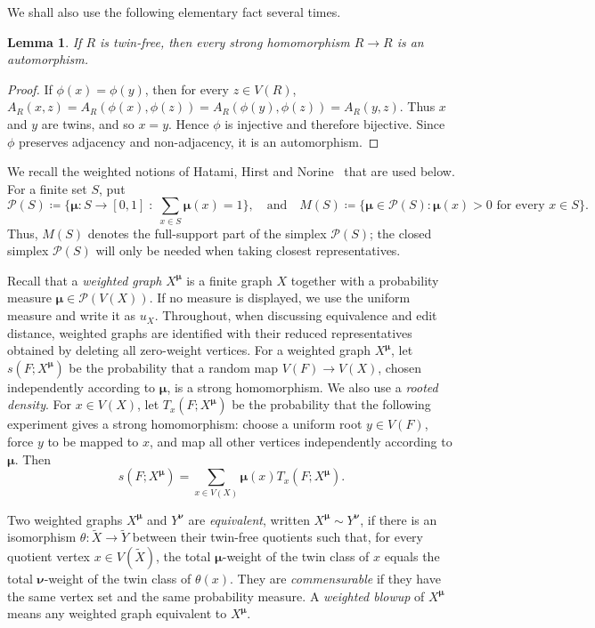 \documentclass[10pt]{article}
\theoremstyle{plain}
\newtheorem{lemma}[lemma]{Lemma}
\theoremstyle{remark}
\newcommand{\bmu}{{\boldsymbol{\mu}}}
\newcommand{\bnu}{{\boldsymbol{\nu}}}
\begin{document}
We shall also use the following elementary fact several times.

\begin{lemma}
\label{lem:twin-free-auto}
If $R$ is twin-free, then every strong homomorphism $R\to R$ is an automorphism.
\end{lemma}
\begin{proof}
If $\phi(x)=\phi(y)$, then for every $z\in V(R)$, $A_R(x,z)=A_R(\phi(x),\phi(z))=A_R(\phi(y),\phi(z))=A_R(y,z)$. Thus $x$ and $y$ are twins, and so $x=y$. Hence $\phi$ is injective and therefore bijective. Since $\phi$ preserves adjacency and non-adjacency, it is an automorphism.
\end{proof}


We recall the weighted notions of Hatami, Hirst and Norine~\cite[Section~2.1]{HatamiHirstNorine} that are used below.
For a finite set $S$, put
\[
        \mathcal P(S)\coloneqq
        \Big\{ \bmu:S\to[0,1]\;:\;\sum_{x\in S}\bmu(x)=1 \Big\},
        \quad\text{and}\quad
        M(S)\coloneqq\{\bmu\in\mathcal P(S):\bmu(x)>0\text{ for every }x\in S\}.
\]
Thus, $M(S)$ denotes the full-support part of the simplex $\mathcal P(S)$; the closed simplex $\mathcal P(S)$ will only be needed when taking closest representatives.



Recall that a \emph{weighted graph} $X^\bmu$ is a finite graph $X$ together with a probability measure $\bmu\in\mathcal P(V(X))$. If no measure is displayed, we use the uniform measure and write it as $u_X$.
Throughout, when discussing equivalence and edit distance, weighted graphs are identified with their reduced representatives obtained by deleting all zero-weight vertices.
For a weighted graph $X^\bmu$, let $s(F;X^\bmu)$ be the probability that a random map $V(F)\to V(X)$, chosen independently according to $\bmu$, is a strong homomorphism. We also use a \emph{rooted density}. For $x\in V(X)$, let $T_x(F;X^\bmu)$ be the probability that the following experiment gives a strong homomorphism: choose a uniform root $y\in V(F)$, force $y$ to be mapped to $x$, and map all other vertices independently according to $\bmu$. Then
\begin{equation}
\label{eq:root-average}
        s(F;X^\bmu)=\sum_{x\in V(X)}\bmu(x)T_x(F;X^\bmu).
\end{equation}

Two weighted graphs $X^\bmu$ and $Y^\bnu$ are \emph{equivalent}, written $X^\bmu\sim Y^\bnu$, if there is an isomorphism $\theta:\widetilde X\to\widetilde Y$ between their twin-free quotients such that, for every quotient vertex $x\in V(\widetilde X)$, the total $\bmu$-weight of the twin class of $x$ equals the total $\bnu$-weight of the twin class of $\theta(x)$. They are \emph{commensurable} if they have the same vertex set and the same probability measure.
A \emph{weighted blowup} of $X^\bmu$ means any weighted graph equivalent to $X^\bmu$.
\end{document}
